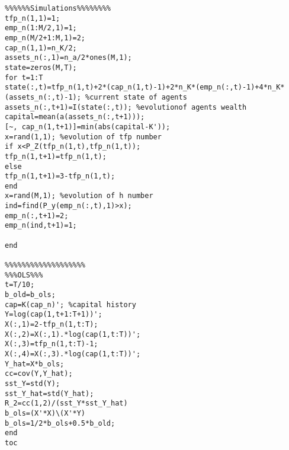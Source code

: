 \documentclass[12pt, a4paper]{article}
\begin{document}
\begin{verbatim}
%%%%%%Simulations%%%%%%%%
tfp_n(1,1)=1;
emp_n(1:M/2,1)=1;
emp_n(M/2+1:M,1)=2;
cap_n(1,1)=n_K/2;
assets_n(:,1)=n_a/2*ones(M,1);
state=zeros(M,T);
for t=1:T
state(:,t)=tfp_n(1,t)+2*(cap_n(1,t)-1)+2*n_K*(emp_n(:,t)-1)+4*n_K*(assets_n(:,t)-1); %current state of agents
assets_n(:,t+1)=I(state(:,t)); %evolutionof agents wealth
capital=mean(a(assets_n(:,t+1)));
[~, cap_n(1,t+1)]=min(abs(capital-K'));
x=rand(1,1); %evolution of tfp number
if x<P_Z(tfp_n(1,t),tfp_n(1,t));
tfp_n(1,t+1)=tfp_n(1,t);
else
tfp_n(1,t+1)=3-tfp_n(1,t);
end
x=rand(M,1); %evolution of h number
ind=find(P_y(emp_n(:,t),1)>x);
emp_n(:,t+1)=2;
emp_n(ind,t+1)=1;

end

%%%%%%%%%%%%%%%%%%%
%%%OLS%%%
t=T/10;
b_old=b_ols;
cap=K(cap_n)'; %capital history
Y=log(cap(1,t+1:T+1))';
X(:,1)=2-tfp_n(1,t:T);
X(:,2)=X(:,1).*log(cap(1,t:T))';
X(:,3)=tfp_n(1,t:T)-1;
X(:,4)=X(:,3).*log(cap(1,t:T))';
Y_hat=X*b_ols;
cc=cov(Y,Y_hat);
sst_Y=std(Y);
sst_Y_hat=std(Y_hat);
R_2=cc(1,2)/(sst_Y*sst_Y_hat)
b_ols=(X'*X)\(X'*Y)
b_ols=1/2*b_ols+0.5*b_old;
end
toc
\end{verbatim}
\end{document}
